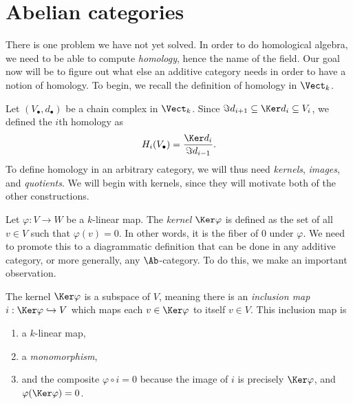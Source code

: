 \section{Abelian categories}

There is one problem we have not yet solved. In order to do homological algebra, we need to be able to compute \emph{homology}, hence the name of the field. Our goal now will be to figure out what else an additive category needs in order to have a notion of homology. To begin, we recall the definition of homology in $\Vect_k$.

Let $(V_{\bullet},d_{\bullet} ) $ be a chain complex in $\Vect_k$. Since $\Im d_{i+1}  \subseteq \Ker d_{i}\subseteq V_i $, we defined the $i$th homology as
\[
	H_i(V_{\bullet} )=\frac{\Ker d_i}{\Im d_{i-1} } 
.\]
To define homology in an arbitrary category, we will thus need \emph{kernels}, \emph{images}, and \emph{quotients}. We will begin with kernels, since they will motivate both of the other constructions.

Let $\varphi : V \to W$ be a $k$-linear map. The \emph{kernel} $\Ker \varphi $ is defined as the set of all $v\in V$ such that $\varphi (v)=0$. In other words, it is the fiber of 0 under $\varphi $. We need to promote this to a diagrammatic definition that can be done in any additive category, or more generally, any $\Ab $-category. To do this, we make an important observation.

\begin{remark}\label{4.1}
	The kernel $\Ker \varphi $ is a subspace of $V$, meaning there is an \emph{inclusion map} $i:\Ker \varphi \hookrightarrow V$ which maps each $v\in \Ker \varphi $ to itself $v\in V$. This inclusion map is
	\begin{enumerate}
		\item a $k$-linear map,
		\item a \emph{monomorphism},
		\item and the composite $\varphi \circ i=0$ because the image of $i$ is precisely $\Ker \varphi $, and $\varphi (\Ker \varphi)=0$.
	\end{enumerate}
\end{remark}

